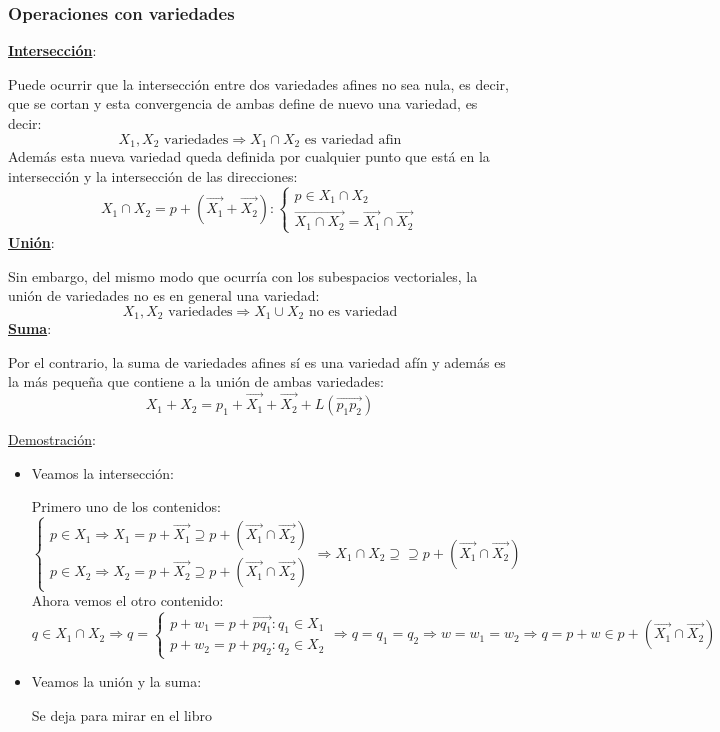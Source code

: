 \documentclass[10pt,a4paper,openright]{book}
\theoremstyle{break}
\begin{document}
\subsubsection*{Operaciones con variedades}
\underline{\textbf{Intersección}}:

Puede ocurrir que la intersección entre dos variedades afines no sea nula, es decir, que se cortan y esta convergencia de ambas define de nuevo una variedad, es decir:
$$X_1, X_2\mbox{ variedades}\Rightarrow X_1\cap X_2\mbox{ es variedad afin}$$
Además esta nueva variedad queda definida por cualquier punto que está en la intersección y la intersección de las direcciones:
$$X_1\cap X_2 = p + (\vec{X_1}+\vec{X_2}): \begin{cases} p\in X_1\cap X_2 \\ \vec{X_1\cap X_2} = \vec{X_1} \cap  \vec{X_2}\end{cases}$$
\underline{\textbf{Unión}}:

Sin embargo, del mismo modo que ocurría con los subespacios vectoriales, la unión de variedades no es en general una variedad:
$$X_1,X_2\mbox{ variedades} \Rightarrow X_1 \cup X_2 \mbox{ no es variedad}$$
\underline{\textbf{Suma}}:

Por el contrario, la suma de variedades afines sí es una variedad afín y además es la más pequeña que contiene a la unión de ambas variedades:
$$X_1+X_2 = p_1 + \vec{X_1} + \vec{X_2} + L(\vec{p_1p_2})$$

\underline{Demostración}:
\begin{itemize}
\item Veamos la intersección:

Primero uno de los contenidos:
$$\begin{cases} p\in X_1\Rightarrow X_1 = p+\vec{X_1} \supseteq p+(\vec{X_1} \cap  \vec{X_2})\\ p\in X_2\Rightarrow X_2 = p+\vec{X_2} \supseteq p+(\vec{X_1} \cap  \vec{X_2})\end{cases} \Rightarrow X_1 \cap X_2 \supseteq \supseteq p+(\vec{X_1} \cap  \vec{X_2})$$
Ahora vemos el otro contenido:
$$q\in X_1\cap X_2\Rightarrow q = \begin{cases} p+w_1= p+\vec{pq_1} : q_1\in X_1 \\ p+w_2 = p+ pq_2 : q_2\in X_2\end{cases} \Rightarrow q = q_1 = q_2 \Rightarrow w = w_1 = w_2\Rightarrow q = p + w \in p+(\vec{X_1} \cap  \vec{X_2})$$

\item Veamos la unión y la suma:

Se deja para mirar en el libro
\end{itemize}
\end{document}
